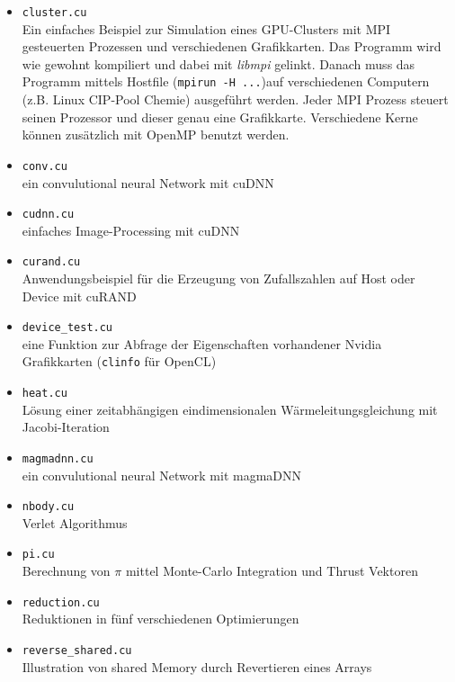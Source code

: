 \documentclass[headsepline=3pt,headinclude=true,12pt,oneside]{scrartcl}
\let\li=\lstinline
\begin{document}
\begin{itemize}
\begin{itemize}
			\item \li`cluster.cu` \\
			Ein einfaches Beispiel zur Simulation eines GPU-Clusters mit MPI gesteuerten Prozessen und verschiedenen Grafikkarten. Das Programm wird wie gewohnt kompiliert und dabei mit \textit{libmpi} gelinkt. Danach muss das Programm mittels Hostfile (\li`mpirun -H ...`)auf verschiedenen Computern (z.B. Linux CIP-Pool Chemie) ausgeführt werden. Jeder MPI Prozess steuert seinen Prozessor und dieser genau eine Grafikkarte. Verschiedene Kerne können zusätzlich mit OpenMP benutzt werden.
			
			\item \li`conv.cu` \\
			ein convulutional neural Network mit cuDNN

			\item \li`cudnn.cu` \\
			einfaches Image-Processing mit cuDNN
			
			\item \li`curand.cu` \\
			Anwendungsbeispiel für die Erzeugung von Zufallszahlen auf Host oder Device mit cuRAND			
			
			\item \li`device_test.cu` \\ 
			eine Funktion zur Abfrage der Eigenschaften vorhandener Nvidia Grafikkarten (\li`clinfo` für OpenCL)			
			
			\item \li`heat.cu` \\
			Lösung einer zeitabhängigen eindimensionalen Wärmeleitungsgleichung mit Jacobi-Iteration
			
			\item \li`magmadnn.cu` \\ 
			ein convulutional neural Network mit magmaDNN		
			
			\item \li`nbody.cu` \\
			Verlet Algorithmus
			
			\item \li`pi.cu` \\
			Berechnung von $\pi$ mittel Monte-Carlo Integration und Thrust Vektoren
			
			\item \li`reduction.cu` \\  
			Reduktionen in fünf verschiedenen Optimierungen			
			
			\item \li`reverse_shared.cu` \\ 
			Illustration von shared Memory durch Revertieren eines Arrays	
			

\end{itemize}
\end{itemize}
\end{document}

